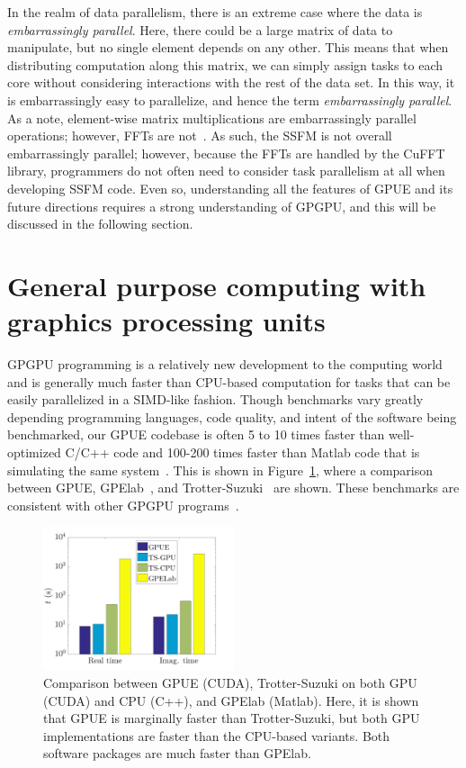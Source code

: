 In the realm of data parallelism, there is an extreme case where the data is \textit{embarrassingly parallel}.
Here, there could be a large matrix of data to manipulate, but no single element depends on any other.
This means that when distributing computation along this matrix, we can simply assign tasks to each core without considering interactions with the rest of the data set.
In this way, it is embarrassingly easy to parallelize, and hence the term \textit{embarrassingly parallel}.
As a note, element-wise matrix multiplications are embarrassingly parallel operations; however, FFTs are not~\cite{czechowski2012}.
As such, the SSFM is not overall embarrassingly parallel; however, because the FFTs are handled by the CuFFT library, programmers do not often need to consider task parallelism at all when developing SSFM code.
Even so, understanding all the features of GPUE and its future directions requires a strong understanding of GPGPU, and this will be discussed in the following section.

\section{General purpose computing with graphics processing units}

GPGPU programming is a relatively new development to the computing world and is generally much faster than CPU-based computation for tasks that can be easily parallelized in a SIMD-like fashion.
Though benchmarks vary greatly depending programming languages, code quality, and intent of the software being benchmarked, our GPUE codebase is often 5 to 10 times faster than well-optimized C/C++ code and 100-200 times faster than Matlab code that is simulating the same system~\cite{wittek2016}.
This is shown in Figure~\ref{fig:bench}, where a comparison between GPUE, GPElab~\cite{antoine2014}, and Trotter-Suzuki~\cite{wittek2013} are shown.
These benchmarks are consistent with other GPGPU programs~\cite{garland2008, lee2010, nickolls2010}.

\begin{figure}
\center \includegraphics[width=0.5\textwidth]{data/gpu/GPUEvsTS.png}
\caption{Comparison between GPUE (CUDA), Trotter-Suzuki on both GPU (CUDA) and CPU (C++), and GPElab (Matlab).
Here, it is shown that GPUE is marginally faster than Trotter-Suzuki, but both GPU implementations are faster than the CPU-based variants.
Both software packages are much faster than GPElab.}
\label{fig:bench}
\end{figure}

